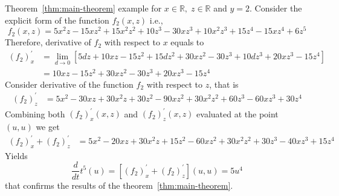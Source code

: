 \begin{example}
    \normalfont
    Theorem~\ref{thm:main-theorem} example for $x\in\mathbb{R}, \; z\in \mathbb{R}$ and $y=2$.
    Consider the explicit form of the function $f_{2} (x, z)$ i.e.,
    \[
        f_2 (x, z) = 5 x^2 z - 15 x z^2 + 15 x^2 z^2 + 10 z^3 - 30 x z^3 + 10 x^2 z^3 + 15 z^4 - 15 x z^4 + 6 z^5
    \]
    Therefore, derivative of $f_{2}$ with respect to $x$ equals to
    \begin{align*}
    (f_2)
        ^{'}_{x} &= \lim_{d \to 0} \left[ 5 d z + 10 x z - 15 z^2 + 15 d z^2 + 30 x z^2 - 30 z^3 + 10 d z^3 +
        20 x z^3 - 15 z^4 \right] \\
        &= 10 x z - 15 z^2 + 30 x z^2 - 30 z^3 + 20 x z^3 - 15 z^4
    \end{align*}
    Consider derivative of the function $f_2$ with respect to $z$, that is
    \begin{align*}
    (f_2)
        ^{'}_{z}
        &= 5 x^2 - 30 x z + 30 x^2 z + 30 z^2 - 90 x z^2 + 30 x^2 z^2 + 60 z^3 - 60 x z^3 + 30 z^4
    \end{align*}
    Combining both $(f_2)^{'}_{x} (x, z)$ and $(f_2)^{'}_{z} (x, z)$ evaluated at the point $(u, u)$ we get
    \begin{align*}
    (f_2)
        ^{'}_{x} + (f_2)^{'}_{z} &= 5 x^2 - 20 x z + 30 x^2 z + 15 z^2 - 60 x z^2 + 30 x^2 z^2 + 30 z^3 - 40 x z^3 + 15 z^4
    \end{align*}
    Yields
    \begin{equation*}
        \frac{d}{dt} t^{5} (u) = [(f_2)^{'}_{x} + (f_2)^{'}_{z}] (u,u) = 5 u^4
    \end{equation*}
    that confirms the results of the theorem~\ref{thm:main-theorem}.
\end{example}
